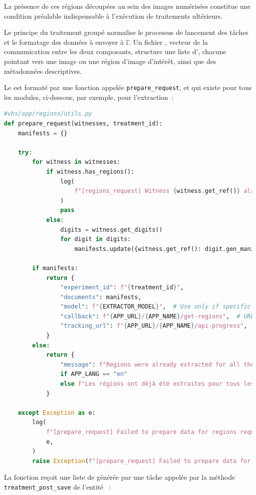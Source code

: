 La présence de ces régions découpées au sein des images numérisées
constitue une condition préalable indispensable à l'exécution de
traitements ultérieurs.

Le principe du traitement groupé normalise le processus de lancement des
tâches et le formatage des données à envoyer à l'\api. Un fichier \json,
vecteur de la communication entre les deux composants, structure une
liste d'\URLs \iiif, chacune pointant vers une image ou une région d'image
d'intérêt, ainsi que des métadonnées
descriptives.

Le \json est formaté par une fonction appelée \texttt{prepare\_request}, et
qui existe pour tous les modules, ci-dessous, par exemple, pour l'extraction~:

\begin{lstlisting}[language=python, frame=single, breaklines=true, caption={Fonction \texttt{prepare\_request du module d'extraction}}]
#vhs/app/regions/utils.py
def prepare_request(witnesses, treatment_id):
    manifests = {}

    try:
        for witness in witnesses:
            if witness.has_regions():
                log(
                    f"[regions_request] Witness {witness.get_ref()} already has regions"
                )
                pass
            else:
                digits = witness.get_digits()
                for digit in digits:
                    manifests.update({witness.get_ref(): digit.gen_manifest_url()})

        if manifests:
            return {
                "experiment_id": f"{treatment_id}",
                "documents": manifests,
                "model": f"{EXTRACTOR_MODEL}",  # Use only if specific model is desire
                "callback": f"{APP_URL}/{APP_NAME}/get-regions",  # URL to which the regions file must be sent back
                "tracking_url": f"{APP_URL}/{APP_NAME}/api-progress",
            }
        else:
            return {
                "message": f"Regions were already extracted for all the selected {WIT}es"
                if APP_LANG == "en"
                else f"Les régions ont déjà été extraites pour tous les {WIT}s sélectionnés"
            }

    except Exception as e:
        log(
            f"[prepare_request] Failed to prepare data for regions request",
            e,
        )
        raise Exception(f"[prepare_request] Failed to prepare data for regions request")
\end{lstlisting}

La fonction reçoit une liste de \wits générée par une tâche
appelée par la méthode \texttt{treatment\_post\_save} de l'entité \tr~:

